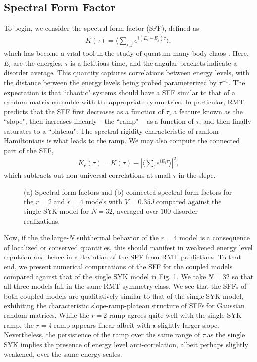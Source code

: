 \documentclass[reprint, floatfix,eqsecnum,superscriptaddress,preprint,nofootinbib,onecolumn,amsmath,amssymb,aps,prb]{revtex4-2}
\begin{document}
\subsection{Spectral Form Factor}

To begin, we consider the spectral form factor (SFF), defined as
\begin{align}
    K(\tau) = \langle \sum_{i,j} e^{i(E_i - E_j) \tau} \rangle,
\end{align}
which has become a vital tool in the study of quantum many-body chaos \cite{Cotler2017,Liu2018sff}.
Here, $E_i$ are the energies, $\tau$ is a fictitious time, and the angular brackets indicate a disorder average. This quantity captures correlations between energy levels, with the distance between the energy levels being probed parameterized by $\tau^{-1}$.
The expectation is that ``chaotic" systems should have a SFF similar to that of a random matrix ensemble with the appropriate symmetries. In particular, RMT predicts that the SFF first decreases as a function of $\tau$, a feature known as the ``slope", then increases linearly -- the ``ramp" -- as a function of $\tau$, and then finally saturates to a ``plateau". The spectral rigidity 
characteristic of random Hamiltonians is what leads to the ramp.
We may also compute the connected part of the SFF,
\begin{align}
    K_c(\tau) = K(\tau) - |\langle\sum_{i} e^{iE_i \tau} \rangle|^2,
\end{align}
which subtracts out non-universal correlations at small $\tau$ in the slope.  

\begin{figure}
\centering
{}\hspace{15mm}
  \caption{(a) Spectral form factors and (b) connected spectral form factors for the $r=2$ and $r=4$ models with $V=0.35J$ compared against the single SYK model for $N=32$, averaged over $100$ disorder realizations. 
  \label{fig:syk-sff} }
\end{figure}

Now, if the the large-$N$ subthermal behavior of the $r=4$ model is a consequence of localized or conserved quantities, this should manifest in weakened energy level repulsion and hence in a deviation of the SFF from RMT predictions.
To that end, we present numerical computations of the SFF for the coupled models compared against that of the single SYK model in Fig. \ref{fig:syk-sff}. 
We take $N=32$ so that all three models fall in the same RMT symmetry class.
We see that the SFFs of both coupled models are qualitatively similar to that of the single SYK model, exhibiting the characteristic slope-ramp-plateau structure of SFFs for Gaussian random matrices. While the $r=2$ ramp agrees quite well with the single SYK ramp, the $r=4$ ramp appears linear albeit with a slightly larger slope. 
Nevertheless, the persistence of the ramp over the same range of $\tau$ as the single SYK implies the presence of energy level anti-correlation, albeit perhaps slightly weakened, over the same energy scales.
\end{document}

